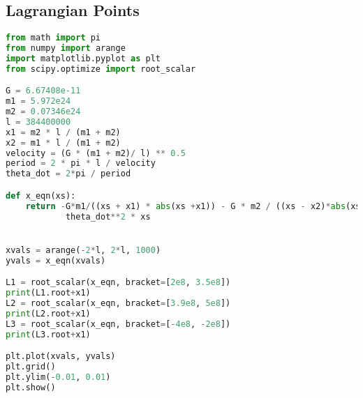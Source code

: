 \subsection{Lagrangian Points}
\begin{lstlisting}[language=python, caption=LP.py]
from math import pi
from numpy import arange
import matplotlib.pyplot as plt
from scipy.optimize import root_scalar

G = 6.67408e-11 
m1 = 5.972e24 
m2 = 0.07346e24
l = 384400000 
x1 = m2 * l / (m1 + m2)
x2 = m1 * l / (m1 + m2)
velocity = (G * (m1 + m2)/ l) ** 0.5
period = 2 * pi * l / velocity
theta_dot = 2*pi / period

def x_eqn(xs):
    return -G*m1/((xs + x1) * abs(xs +x1)) - G * m2 / ((xs - x2)*abs(xs-x2)) + \
            theta_dot**2 * xs


xvals = arange(-2*l, 2*l, 1000)
yvals = x_eqn(xvals)

L1 = root_scalar(x_eqn, bracket=[2e8, 3.5e8])
print(L1.root+x1)
L2 = root_scalar(x_eqn, bracket=[3.9e8, 5e8])
print(L2.root+x1)
L3 = root_scalar(x_eqn, bracket=[-4e8, -2e8])
print(L3.root+x1)

plt.plot(xvals, yvals)
plt.grid()
plt.ylim(-0.01, 0.01)
plt.show()
\end{lstlisting}